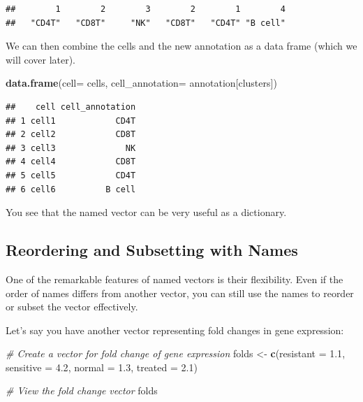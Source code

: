 \documentclass[
]{book}
\newenvironment{Shaded}{\begin{snugshade}}{\end{snugshade}}
\newcommand{\AttributeTok}[1]{\textcolor[rgb]{0.13,0.29,0.53}{#1}}
\newcommand{\CommentTok}[1]{\textcolor[rgb]{0.56,0.35,0.01}{\textit{#1}}}
\newcommand{\FloatTok}[1]{\textcolor[rgb]{0.00,0.00,0.81}{#1}}
\newcommand{\FunctionTok}[1]{\textcolor[rgb]{0.13,0.29,0.53}{\textbf{#1}}}
\newcommand{\NormalTok}[1]{#1}
\newcommand{\OtherTok}[1]{\textcolor[rgb]{0.56,0.35,0.01}{#1}}
\begin{document}
\begin{verbatim}
##        1        2        3        2        1        4 
##   "CD4T"   "CD8T"     "NK"   "CD8T"   "CD4T" "B cell"
\end{verbatim}

We can then combine the cells and the new annotation as a data frame (which we will cover later).

\begin{Shaded}
\begin{Highlighting}[]
\FunctionTok{data.frame}\NormalTok{(}\AttributeTok{cell=}\NormalTok{ cells, }\AttributeTok{cell\_annotation=}\NormalTok{ annotation[clusters])}
\end{Highlighting}
\end{Shaded}

\begin{verbatim}
##    cell cell_annotation
## 1 cell1            CD4T
## 2 cell2            CD8T
## 3 cell3              NK
## 4 cell4            CD8T
## 5 cell5            CD4T
## 6 cell6          B cell
\end{verbatim}

You see that the named vector can be very useful as a dictionary.

\hypertarget{reordering-and-subsetting-with-names}{%
\subsection{Reordering and Subsetting with Names}\label{reordering-and-subsetting-with-names}}

One of the remarkable features of named vectors is their flexibility. Even if the order of names differs from another vector, you can still use the names to reorder or subset the vector effectively.

Let's say you have another vector representing fold changes in gene expression:

\begin{Shaded}
\begin{Highlighting}[]
\CommentTok{\# Create a vector for fold change of gene expression}
\NormalTok{folds }\OtherTok{\textless{}{-}} \FunctionTok{c}\NormalTok{(}\AttributeTok{resistant =} \FloatTok{1.1}\NormalTok{, }\AttributeTok{sensitive =} \FloatTok{4.2}\NormalTok{, }\AttributeTok{normal =} \FloatTok{1.3}\NormalTok{, }\AttributeTok{treated =} \FloatTok{2.1}\NormalTok{)}

\CommentTok{\# View the fold change vector}
\NormalTok{folds}
\end{Highlighting}
\end{Shaded}
\end{document}
